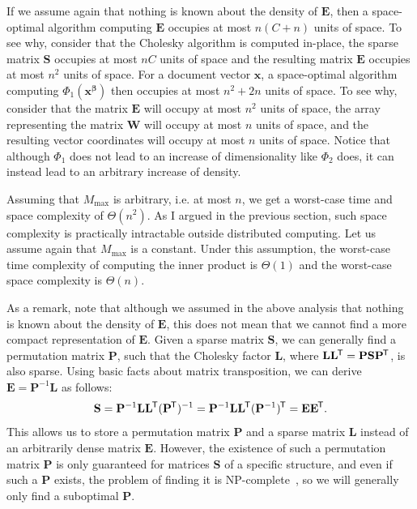 \documentclass[
  digital, %
  notable, %
  lof,     %
  lot,     %
  nopalatino, color
]{fithesis3}
\newcommand*{\tran}{^{\mkern-1.5mu\mathsf{T}}}
\begin{document}
If we assume again that nothing is known about the density of $\mathbf
E$, then a space-optimal algorithm computing $\mathbf
E$ occupies at most $n(C+n)$ units of
space. To see why, consider that the Cholesky algorithm is computed in-place,
the sparse matrix $\mathbf S$ occupies at most $nC$ units of
space and the resulting matrix $\mathbf E$ occupies at most $n^2$ units of
space. For a document vector $\mathbf x$, a space-optimal algorithm computing
$\Phi_1(\mathbf x^{\bm\beta})$ then occupies at most
$n^2+2n$ units of space. To see why, consider that the matrix
$\mathbf E$ will occupy at most $n^2$ units of space, the array representing
the matrix $\mathbf W$ will occupy at most $n$ units of
space, and the resulting vector coordinates will occupy at most $n$ units of
space. Notice that although $\Phi_1$ does not lead to an
increase of dimensionality like $\Phi_2$ does, it can instead
lead to an arbitrary increase of density.

Assuming that $M_{\max}$ is arbitrary, i.e. at most
$n$, we get a worst-case time and space complexity of $\Theta(n^2)$.
As I argued in the previous section, such space complexity is practically
intractable outside distributed computing. Let us assume again that
$M_{\max}$ is a constant. Under this assumption, the
worst-case time complexity of computing the inner product is $\Theta(1)$ and
the worst-case space complexity is $\Theta(n)$.

As a remark, note that although we assumed in the above analysis that
nothing is known about the density of $\mathbf E$, this
does not mean that we cannot find a more compact representation of $\mathbf E$.
Given a sparse matrix $\mathbf S$, we can generally find a permutation matrix
$\mathbf P$, such that the Cholesky
factor $\mathbf L$, where $\mathbf L\mathbf
L\tran=\mathbf P\mathbf S\mathbf P\tran$, is also sparse.  Using basic facts
about matrix transposition, we can derive $\mathbf E=\mathbf P^{-1}\mathbf L$
as follows:
\begin{equation*}
  \mathbf S
  = \mathbf P^{-1}\mathbf L\mathbf L\tran(\mathbf P\tran)^{-1}
  = \mathbf P^{-1}\mathbf L\mathbf L\tran(\mathbf P^{-1})\tran
  = \mathbf E\mathbf E\tran.
\end{equation*}
This allows us to store a permutation matrix $\mathbf P$ and a sparse matrix
$\mathbf L$ instead of an arbitrarily dense
matrix $\mathbf E$. However, the existence of such a permutation matrix
$\mathbf P$ is only guaranteed for matrices $\mathbf
S$ of a specific structure, and even if such a $\mathbf
P$ exists, the problem of finding it is
\textsf{NP}-complete~\cite{yannakakis1981computing}, so we will generally only
find a suboptimal $\mathbf P$.
\end{document}
